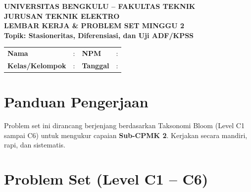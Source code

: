 \documentclass[11pt,a4paper]{article}
\begin{document}
\begin{center}
    {\large \textbf{\color{primaryblue}UNIVERSITAS BENGKULU -- FAKULTAS TEKNIK}}\\[0.1cm]
    {\large \textbf{\color{secondaryblue}JURUSAN TEKNIK ELEKTRO}}\\[0.25cm]
    {\LARGE \textbf{\color{primaryblue}LEMBAR KERJA \& PROBLEM SET MINGGU 2}}\\[0.1cm]
    {\normalsize \textbf{Topik: Stasioneritas, Diferensiasi, dan Uji ADF/KPSS}}
\end{center}

\vspace{0.2cm}

\begin{tcolorbox}[colback=boxbg,colframe=primaryblue,arc=2mm,title=\textbf{Identitas Mahasiswa}]
\small
\begin{tabular}{p{2.5cm}p{5.5cm}p{2.5cm}p{4.5cm}}
\textbf{Nama} & : \dotfill & \textbf{NPM} & : \dotfill \\
\textbf{Kelas/Kelompok} & : \dotfill & \textbf{Tanggal} & : \dotfill \\
\end{tabular}
\end{tcolorbox}

\vspace{0.2cm}

\section{Panduan Pengerjaan}
Problem set ini dirancang berjenjang berdasarkan Taksonomi Bloom (Level C1 sampai C6) untuk mengukur capaian \textbf{Sub-CPMK 2}. Kerjakan secara mandiri, rapi, dan sistematis.

\section{Problem Set (Level C1 -- C6)}
\end{document}

